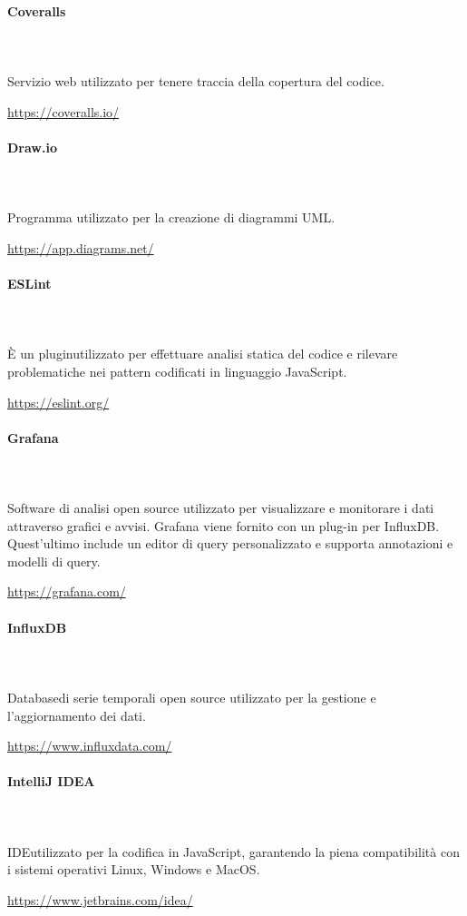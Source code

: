 	\paragraph{Coveralls}\mbox{} \\ \mbox{} \\
	Servizio web utilizzato per tenere traccia della copertura del codice.\\
	\centerline{\url{https://coveralls.io/}}
	\paragraph{Draw.io}\mbox{} \\ \mbox{} \\
	Programma utilizzato per la creazione di diagrammi UML.\\
	\centerline{\url{https://app.diagrams.net/}}
	\paragraph{ESLint}\mbox{} \\ \mbox{} \\
	È un plugin\glo utilizzato per effettuare analisi statica del codice e rilevare problematiche nei pattern codificati in linguaggio JavaScript\glo. \\
	\centerline{\url{https://eslint.org/}}
	\paragraph{Grafana}	\mbox{} \\ \mbox{} \\
	Software di analisi open source utilizzato per visualizzare e monitorare i dati attraverso grafici e avvisi. Grafana viene fornito con un plug-in per InfluxDB. Quest'ultimo include un editor di query personalizzato e supporta annotazioni e modelli di query.\\
	\centerline{\url{https://grafana.com/}}
	\paragraph{InfluxDB}\mbox{} \\ \mbox{} \\
	Database\glo di serie temporali open source utilizzato per la gestione e l'aggiornamento dei dati.\\
	\centerline{\url{https://www.influxdata.com/}}
	\paragraph{IntelliJ IDEA}\mbox{} \\ \mbox{} \\
	IDE\glo utilizzato per la codifica in JavaScript, garantendo la piena compatibilità con i sistemi operativi Linux, Windows e MacOS.\\
	\centerline{\url{https://www.jetbrains.com/idea/}}
